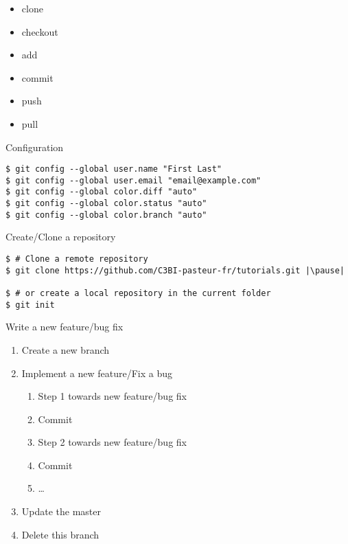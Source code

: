 \def\git#1{{\small\color{git}\$ git #1}\\}

\begin{frame}
    \begin{itemize}
        \item clone
        \item  checkout
        \item  add
        \item commit
        \item push
        \item pull
    \end{itemize}
\end{frame}

\begin{frame}[fragile]{Configuration}
	\begin{lstlisting}
$ git config --global user.name "First Last"
$ git config --global user.email "email@example.com"
$ git config --global color.diff "auto"
$ git config --global color.status "auto"
$ git config --global color.branch "auto"
	\end{lstlisting}
\end{frame}

\begin{frame}[fragile]{Create/Clone a repository}
	\begin{lstlisting}
$ # Clone a remote repository
$ git clone https://github.com/C3BI-pasteur-fr/tutorials.git |\pause|

$ # or create a local repository in the current folder
$ git init
	\end{lstlisting}
\end{frame}

\begin{frame}[fragile]{Write a new feature/bug fix}
	\begin{enumerate}
		\item Create a new branch
		\item Implement a new feature/Fix a bug
		\begin{enumerate}
			\item Step 1 towards new feature/bug fix
			\item Commit
			\item Step 2 towards new feature/bug fix
			\item Commit
			\item \ldots
		\end{enumerate}
		\item Update the master
		\item Delete this branch 
	\end{enumerate}
\end{frame}

